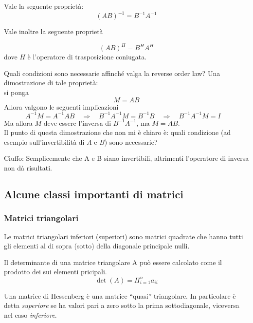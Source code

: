 \begin{property}
Vale la seguente propriet\`a:
$$ (AB)^{-1} = B^{-1} A^{-1}$$
\end{property}

Vale inoltre la seguente propriet\`a
\begin{property}
\begin{equation}\label{eq:eq001}  (AB)^{H} =  B^{H} A^{H}\end{equation}
dove $H$ \`e l'operatore di trasposizione coniugata.
\end{property}

\begin{openquestion}
Quali condizioni sono necessarie affinch\'e valga la reverse order law?
Una dimostrazione di tale proprietà: \\
si ponga 
$$ M = AB$$
Allora valgono le seguenti implicazioni
$$ A^{-1}M = A^{-1}AB \quad \Rightarrow \quad
 B^{-1}A^{-1}M = B^{-1}B  \quad
 \Rightarrow \quad
 B^{-1}A^{-1}M = I \quad 
$$
Ma allora $M$ deve essere l'inversa di $B^{-1}A^{-1}$, ma $M=AB$. \\
Il punto di questa dimostrazione che non mi \`e chiaro \`e:
quali condizione (ad esempio  sull'invertibilità di $A$ e $B$)
sono necessarie?

Ciuffo: Semplicemente che A e B siano invertibili, altrimenti 
l'operatore di inversa non dà risultati.
\end{openquestion}

\subsection{Alcune classi importanti di matrici}
\subsubsection{Matrici triangolari}
\begin{defn}
Le matrici triangolari inferiori (superiori) sono matrici quadrate che
hanno tutti gli elementi al di sopra (sotto) della diagonale
principale nulli.
\end{defn}

Il determinante di una matrice triangolare A può essere calcolato come il
prodotto dei sui elementi pricipali.
$$ \det(A) = \Pi_{i=1}^{n} a_{ii} $$ \label{triangolari}

\begin{defn}
\label{def:hessenberg}
Una matrice di Hessenberg \`e una matrice ``quasi'' triangolare. In
particolare \`e detta \emph{superiore} se ha valori pari a zero sotto la prima
sottodiagonale, viceversa nel caso \emph{inferiore}.
\end{defn}


